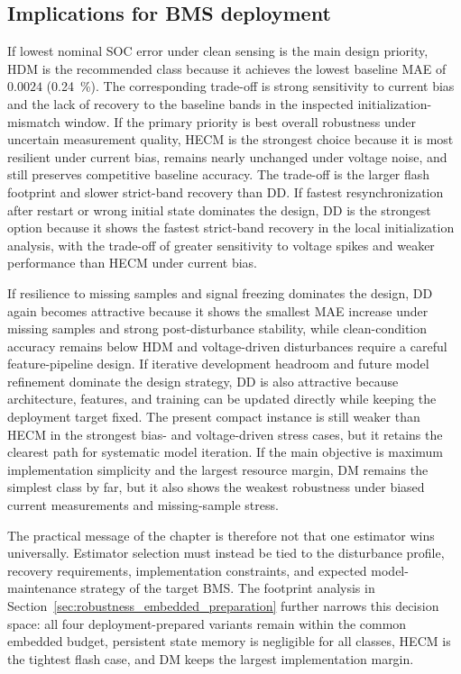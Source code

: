 \documentclass[
    a4paper,
    12pt,
    titlepage,
    bibliography=totoc,
    twoside=on,
    parskip=false,
    numbers=noenddot,
    cleardoublepage=empty,
    DIV=12,
    BCOR=12.0mm,
    headheight=36pt,
    headings=openright
]{scrreprt}
\begin{document}
\subsection{Implications for BMS deployment}
\label{sec:robustness_decision_interpretation}
If lowest nominal SOC error under clean sensing is the main design priority, HDM is the recommended class because it achieves the lowest baseline MAE of $0.0024$ (\SI{0.24}{\percent}). The corresponding trade-off is strong sensitivity to current bias and the lack of recovery to the baseline bands in the inspected initialization-mismatch window. If the primary priority is best overall robustness under uncertain measurement quality, HECM is the strongest choice because it is most resilient under current bias, remains nearly unchanged under voltage noise, and still preserves competitive baseline accuracy. The trade-off is the larger flash footprint and slower strict-band recovery than DD. If fastest resynchronization after restart or wrong initial state dominates the design, DD is the strongest option because it shows the fastest strict-band recovery in the local initialization analysis, with the trade-off of greater sensitivity to voltage spikes and weaker performance than HECM under current bias.

If resilience to missing samples and signal freezing dominates the design, DD again becomes attractive because it shows the smallest MAE increase under missing samples and strong post-disturbance stability, while clean-condition accuracy remains below HDM and voltage-driven disturbances require a careful feature-pipeline design. If iterative development headroom and future model refinement dominate the design strategy, DD is also attractive because architecture, features, and training can be updated directly while keeping the deployment target fixed. The present compact instance is still weaker than HECM in the strongest bias- and voltage-driven stress cases, but it retains the clearest path for systematic model iteration. If the main objective is maximum implementation simplicity and the largest resource margin, DM remains the simplest class by far, but it also shows the weakest robustness under biased current measurements and missing-sample stress.

The practical message of the chapter is therefore not that one estimator wins universally. Estimator selection must instead be tied to the disturbance profile, recovery requirements, implementation constraints, and expected model-maintenance strategy of the target BMS. The footprint analysis in Section~\ref{sec:robustness_embedded_preparation} further narrows this decision space: all four deployment-prepared variants remain within the common embedded budget, persistent state memory is negligible for all classes, HECM is the tightest flash case, and DM keeps the largest implementation margin.
\end{document}
